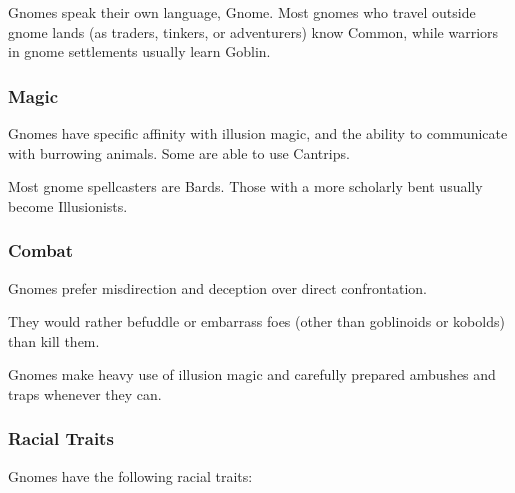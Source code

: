 Gnomes speak their own language, Gnome. Most gnomes who travel outside gnome lands (as traders, tinkers, or adventurers) know Common, while warriors in gnome settlements usually learn Goblin.
\subsubsection{Magic}
Gnomes have specific affinity with illusion magic, and the ability to communicate with burrowing animals. Some are able to use Cantrips.

Most gnome spellcasters are Bards. Those with a more scholarly bent usually become Illusionists.
\subsubsection{Combat}
Gnomes prefer misdirection and deception over direct confrontation.

They would rather befuddle or embarrass foes (other than goblinoids or kobolds) than kill them.

Gnomes make heavy use of illusion magic and carefully prepared ambushes and traps whenever they can.
\subsubsection{Racial Traits}
Gnomes have the following racial traits: 

